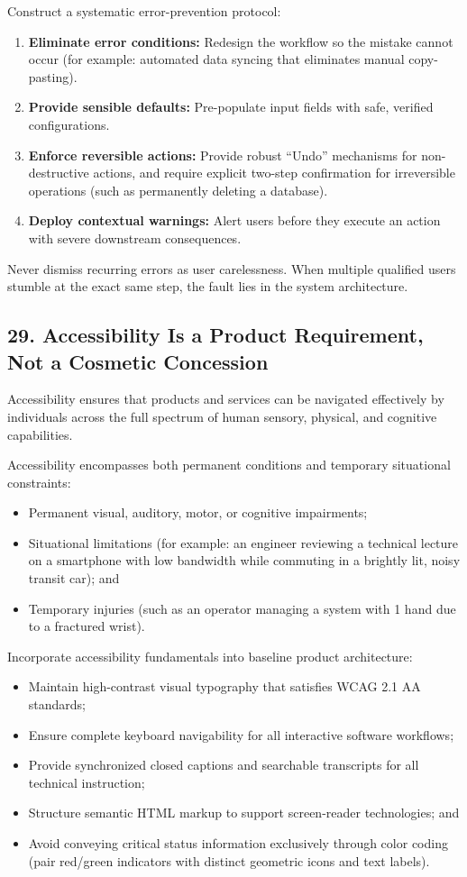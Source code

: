 Construct a systematic error-prevention protocol:
\begin{enumerate}
    \item \textbf{Eliminate error conditions:} Redesign the workflow so the mistake cannot occur (for example: automated data syncing that eliminates manual copy-pasting).
    \item \textbf{Provide sensible defaults:} Pre-populate input fields with safe, verified configurations.
    \item \textbf{Enforce reversible actions:} Provide robust ``Undo'' mechanisms for non-destructive actions, and require explicit two-step confirmation for irreversible operations (such as permanently deleting a database).
    \item \textbf{Deploy contextual warnings:} Alert users before they execute an action with severe downstream consequences.
\end{enumerate}

Never dismiss recurring errors as user carelessness. When multiple qualified users stumble at the exact same step, the fault lies in the system architecture.

\subsection*{29. Accessibility Is a Product Requirement, Not a Cosmetic Concession}

Accessibility ensures that products and services can be navigated effectively by individuals across the full spectrum of human sensory, physical, and cognitive capabilities.

Accessibility encompasses both permanent conditions and temporary situational constraints:
\begin{itemize}
    \item Permanent visual, auditory, motor, or cognitive impairments;
    \item Situational limitations (for example: an engineer reviewing a technical lecture on a smartphone with low bandwidth while commuting in a brightly lit, noisy transit car); and
    \item Temporary injuries (such as an operator managing a system with 1 hand due to a fractured wrist).
\end{itemize}

Incorporate accessibility fundamentals into baseline product architecture:
\begin{itemize}
    \item Maintain high-contrast visual typography that satisfies WCAG 2.1 AA standards;
    \item Ensure complete keyboard navigability for all interactive software workflows;
    \item Provide synchronized closed captions and searchable transcripts for all technical instruction;
    \item Structure semantic HTML markup to support screen-reader technologies; and
    \item Avoid conveying critical status information exclusively through color coding (pair red/green indicators with distinct geometric icons and text labels).
\end{itemize}

